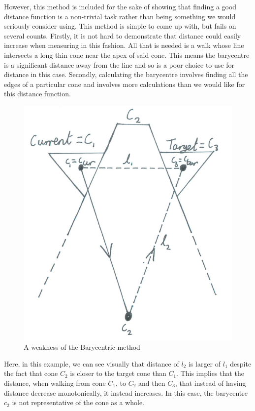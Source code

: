 \documentclass[12pt,a4paper]{report}
\begin{document}
However, this method is included for the sake of showing that finding a good distance function is a non-trivial task rather than being something we would seriously consider using. This method is simple to come up with, but fails on several counts. Firstly, it is not hard to demonstrate that distance could easily increase when measuring in this fashion. All that is needed is a walk whose line intersects a long thin cone near the apex of said cone. This means the barycentre is a significant distance away from the line and so is a poor choice to use for distance in this case. Secondly, calculating the barycentre involves finding all the edges of a particular cone and involves more calculations than we would like for this distance function. 

\begin{figure}
\includegraphics[scale=0.5]{Chapters/images/Barycentre2.png}
\caption{A weakness of the Barycentric method}
\label{BadBarycentre}
\end{figure}

Here, in this example, we can see visually that distance of $l_{2}$ is larger of $l_{1}$ despite the fact that cone $C_{2}$ is closer to the target cone than $C_{1}$. This implies that the distance, when walking from cone $C_{1}$, to $C_{2}$ and then $C_{3}$, that instead of having distance decrease monotonically, it instead increases. In this case, the barycentre $c_{2}$ is not representative of the cone as a whole. 
\end{document}
